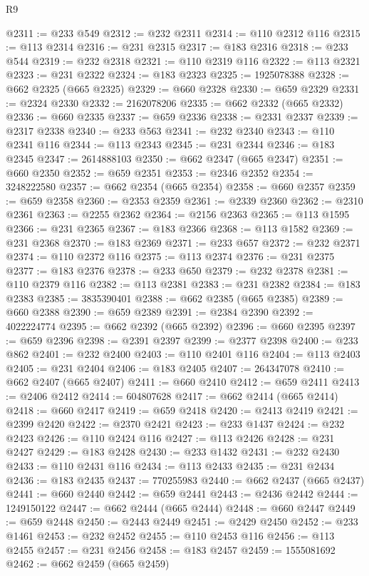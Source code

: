 \begin{lexlean}{R9}
\begin{coremodule}
@2311 := @233 @549
@2312 := @232 @2311
@2314 := @110 @2312 @116
@2315 := @113 @2314
@2316 := @231 @2315
@2317 := @183 @2316
@2318 := @233 @544
@2319 := @232 @2318
@2321 := @110 @2319 @116
@2322 := @113 @2321
@2323 := @231 @2322
@2324 := @183 @2323
@2325 := 1925078388
@2328 := @662 @2325 (@665 @2325)
@2329 := @660 @2328
@2330 := @659 @2329
@2331 := @2324 @2330
@2332 := 2162078206
@2335 := @662 @2332 (@665 @2332)
@2336 := @660 @2335
@2337 := @659 @2336
@2338 := @2331 @2337
@2339 := @2317 @2338
@2340 := @233 @563
@2341 := @232 @2340
@2343 := @110 @2341 @116
@2344 := @113 @2343
@2345 := @231 @2344
@2346 := @183 @2345
@2347 := 2614888103
@2350 := @662 @2347 (@665 @2347)
@2351 := @660 @2350
@2352 := @659 @2351
@2353 := @2346 @2352
@2354 := 3248222580
@2357 := @662 @2354 (@665 @2354)
@2358 := @660 @2357
@2359 := @659 @2358
@2360 := @2353 @2359
@2361 := @2339 @2360
@2362 := @2310 @2361
@2363 := @2255 @2362
@2364 := @2156 @2363
@2365 := @113 @1595
@2366 := @231 @2365
@2367 := @183 @2366
@2368 := @113 @1582
@2369 := @231 @2368
@2370 := @183 @2369
@2371 := @233 @657
@2372 := @232 @2371
@2374 := @110 @2372 @116
@2375 := @113 @2374
@2376 := @231 @2375
@2377 := @183 @2376
@2378 := @233 @650
@2379 := @232 @2378
@2381 := @110 @2379 @116
@2382 := @113 @2381
@2383 := @231 @2382
@2384 := @183 @2383
@2385 := 3835390401
@2388 := @662 @2385 (@665 @2385)
@2389 := @660 @2388
@2390 := @659 @2389
@2391 := @2384 @2390
@2392 := 4022224774
@2395 := @662 @2392 (@665 @2392)
@2396 := @660 @2395
@2397 := @659 @2396
@2398 := @2391 @2397
@2399 := @2377 @2398
@2400 := @233 @862
@2401 := @232 @2400
@2403 := @110 @2401 @116
@2404 := @113 @2403
@2405 := @231 @2404
@2406 := @183 @2405
@2407 := 264347078
@2410 := @662 @2407 (@665 @2407)
@2411 := @660 @2410
@2412 := @659 @2411
@2413 := @2406 @2412
@2414 := 604807628
@2417 := @662 @2414 (@665 @2414)
@2418 := @660 @2417
@2419 := @659 @2418
@2420 := @2413 @2419
@2421 := @2399 @2420
@2422 := @2370 @2421
@2423 := @233 @1437
@2424 := @232 @2423
@2426 := @110 @2424 @116
@2427 := @113 @2426
@2428 := @231 @2427
@2429 := @183 @2428
@2430 := @233 @1432
@2431 := @232 @2430
@2433 := @110 @2431 @116
@2434 := @113 @2433
@2435 := @231 @2434
@2436 := @183 @2435
@2437 := 770255983
@2440 := @662 @2437 (@665 @2437)
@2441 := @660 @2440
@2442 := @659 @2441
@2443 := @2436 @2442
@2444 := 1249150122
@2447 := @662 @2444 (@665 @2444)
@2448 := @660 @2447
@2449 := @659 @2448
@2450 := @2443 @2449
@2451 := @2429 @2450
@2452 := @233 @1461
@2453 := @232 @2452
@2455 := @110 @2453 @116
@2456 := @113 @2455
@2457 := @231 @2456
@2458 := @183 @2457
@2459 := 1555081692
@2462 := @662 @2459 (@665 @2459)

\end{coremodule}
\end{lexlean}
